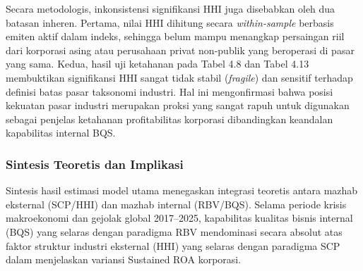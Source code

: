 \documentclass[12pt,a4paper]{article}
\begin{document}
Secara metodologis, inkonsistensi signifikansi HHI juga disebabkan oleh
dua batasan inheren. Pertama, nilai HHI dihitung secara
\emph{within-sample} berbasis emiten aktif dalam indeks, sehingga belum
mampu menangkap persaingan riil dari korporasi asing atau perusahaan
privat non-publik yang beroperasi di pasar yang sama. Kedua, hasil uji
ketahanan pada Tabel 4.8 dan Tabel 4.13 membuktikan signifikansi HHI
sangat tidak stabil (\emph{fragile}) dan sensitif terhadap definisi
batas pasar taksonomi industri. Hal ini mengonfirmasi bahwa posisi
kekuatan pasar industri merupakan proksi yang sangat rapuh untuk
digunakan sebagai penjelas ketahanan profitabilitas korporasi
dibandingkan keandalan kapabilitas internal BQS.

\subsubsection{Sintesis Teoretis dan
Implikasi}\label{sintesis-teoretis-dan-implikasi}

Sintesis hasil estimasi model utama menegaskan integrasi teoretis antara
mazhab eksternal (SCP/HHI) dan mazhab internal (RBV/BQS). Selama periode
krisis makroekonomi dan gejolak global 2017--2025, kapabilitas kualitas
bisnis internal (BQS) yang selaras dengan paradigma RBV mendominasi
secara absolut atas faktor struktur industri eksternal (HHI) yang
selaras dengan paradigma SCP dalam menjelaskan variansi Sustained ROA
korporasi.
\end{document}
